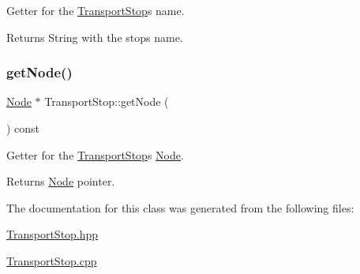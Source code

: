 Getter for the \hyperlink{class_transport_stop}{Transport\+Stop}\textquotesingle{}s name.

\begin{DoxyReturn}{Returns}
String with the stop\textquotesingle{}s name. 
\end{DoxyReturn}
\hypertarget{class_transport_stop_ab38b14d8cfac1949ac8f853fdf8620bc}{}\label{class_transport_stop_ab38b14d8cfac1949ac8f853fdf8620bc} 
\subsubsection{\texorpdfstring{get\+Node()}{getNode()}}
{\footnotesize\ttfamily \hyperlink{class_node}{Node} $\ast$ Transport\+Stop\+::get\+Node (\begin{DoxyParamCaption}{ }\end{DoxyParamCaption}) const}

Getter for the \hyperlink{class_transport_stop}{Transport\+Stop}\textquotesingle{}s \hyperlink{class_node}{Node}.

\begin{DoxyReturn}{Returns}
\hyperlink{class_node}{Node} pointer. 
\end{DoxyReturn}


The documentation for this class was generated from the following files\+:\begin{DoxyCompactItemize}
\item 
\hyperlink{_transport_stop_8hpp}{Transport\+Stop.\+hpp}\item 
\hyperlink{_transport_stop_8cpp}{Transport\+Stop.\+cpp}\end{DoxyCompactItemize}
